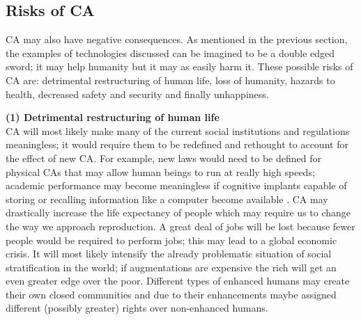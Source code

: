 \subsection{Risks of CA}


CA may also have negative consequences. As mentioned in the previous section, the examples of technologies discussed can be imagined to be a double edged sword; it may help humanity but it may as easily harm it. These possible risks of CA are: detrimental restructuring of human life, loss of humanity, hazards to health, decreased safety and security and finally unhappiness.

\textbf{(1) Detrimental restructuring of human life} \\
CA will most likely make many of the current social institutions and regulations meaningless; it would require them to be redefined and rethought to account for the effect of new CA. For example, new laws would need to be defined for physical CAs that may allow human beings to run at really high speeds; academic performance may become meaningless if cognitive implants capable of storing or recalling information like a computer become available \cite{bostrom2013ethical}. CA may drastically increase the life expectancy of people which may require us to change the way we approach reproduction. A great deal of jobs will be lost because fewer people would be required to perform jobs; this may lead to a global economic crisis. It will most likely intensify the already problematic situation of social stratification in the world; if augmentations are expensive the rich will get an even greater edge over the poor. Different types of enhanced humans may create their own closed communities and due to their enhancements maybe assigned different (possibly greater) rights over non-enhanced humans.



